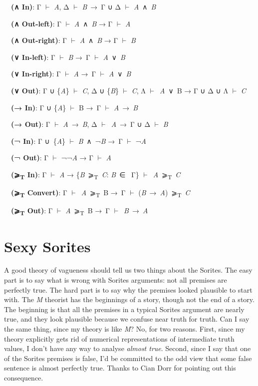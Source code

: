 \documentclass[
  10pt,
  letterpaper,
  DIV=11,
  numbers=noendperiod,
  twoside]{scrartcl}
\begin{document}
~~\textbf{(∧ In)}: Γ \(\vdash\) \emph{A}, Δ \(\vdash\) \emph{B}~→~Γ ∪ Δ
\(\vdash\) \emph{A}~∧~\emph{B}\\
\strut ~~\textbf{(∧ Out-left)}: Γ \(\vdash\) \emph{A}~∧~\emph{B} → Γ
\(\vdash\) \emph{A}\\
\strut ~~\textbf{(∧ Out-right)}: Γ \(\vdash\) \emph{A}~∧~\emph{B} → Γ
\(\vdash\) \emph{B}\\
\strut ~~\textbf{(∨ In-left)}: Γ \(\vdash\) \emph{B} →~Γ \(\vdash\)
\emph{A}~∨~\emph{B}\\
\strut ~~\textbf{(∨ In-right)}: Γ \(\vdash\) \emph{A} →~Γ \(\vdash\)
\emph{A}~∨~\emph{B}\\
\strut ~~\textbf{(∨ Out)}: Γ ∪ \{\emph{A}\} \(\vdash\) \emph{C}, Δ ∪
\{\emph{B}\} \(\vdash\) \emph{C}, Λ \(\vdash\)~\emph{A}~∨~B → Γ ∪ Δ ∪ Λ
\(\vdash\) \emph{C}\\
\strut ~~\textbf{(→ In)}: Γ ∪ \{\emph{A}\} \(\vdash\) B →~Γ \(\vdash\)
\emph{A}~→~\emph{B}\\
\strut ~~\textbf{(→ Out)}: Γ \(\vdash\) \emph{A}~→~\emph{B}, Δ
\(\vdash\)~\emph{A}~→~Γ ∪ Δ \(\vdash\) \emph{B}\\
\strut ~~\textbf{(¬ In)}: Γ ∪~\{\emph{A}\} \(\vdash\)
\emph{B}~∧~¬\emph{B} →~Γ \(\vdash\) ¬\emph{A}\\
\strut ~~\textbf{(¬ Out)}: Γ \(\vdash\) ¬¬\emph{A} → Γ \(\vdash\)
\emph{A}\\
\strut ~~\textbf{(⩾\textsubscript{T} In)}: Γ \(\vdash\) \emph{A} →
\{\emph{B}~⩾\textsubscript{T}~\emph{C}: \emph{B}~∈~ Γ\}
\(\vdash\)~\emph{A}~⩾\textsubscript{T}~\emph{C}\\
\strut ~~\textbf{(⩾\textsubscript{T} Convert)}: Γ
\(\vdash\)~\emph{A}~⩾\textsubscript{T}~B →~Γ \(\vdash\)
(\emph{B}~→~\emph{A})~⩾\textsubscript{T}~\emph{C}\\
\strut ~~\textbf{(⩾\textsubscript{T} Out)}: Γ \(\vdash\)
\emph{A}~⩾\textsubscript{T}~B →~Γ \(\vdash\)~\emph{B}~→~\emph{A}

\section{Sexy Sorites}\label{sexy-sorites}

A good theory of vagueness should tell us two things about the Sorites.
The easy part is to say what is wrong with Sorites arguments: not all
premises are perfectly true. The hard part is to say why the premises
looked plausible to start with. The \emph{M} theorist has the beginnings
of a story, though not the end of a story. The beginning is that all the
premises in a typical Sorites argument are nearly true, and they look
plausible because we confuse near truth for truth. Can I say the same
thing, since my theory is like \emph{M}? No, for two reasons. First,
since my theory explicitly gets rid of numerical representations of
intermediate truth values, I don't have any way to analyse \emph{almost
true}. Second, since I say that one of the Sorites premises is false,
I'd be committed to the odd view that some false sentence is almost
perfectly true. Thanks to Cian Dorr for pointing out this consequence.
\end{document}
